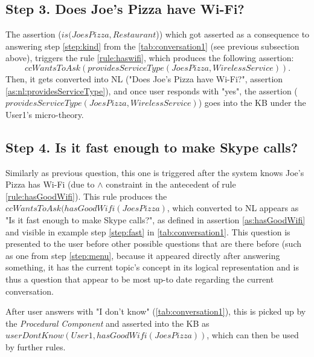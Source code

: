 \subsection{Step 3. Does Joe's Pizza have Wi-Fi?}
\label{section:step3}
The assertion ($is(JoesPizza,Restaurant$)) which got asserted as a consequence
to answering step \ref{step:kind} from the \autoref{tab:conversation1} (see
previous subsection above), triggers the rule \ref{rule:haswifi}, which 
produces the following assertion: 
\begin{equation*}
ccWantsToAsk(providesServiceType(JoesPizza,WirelessService)).
\end{equation*}
Then, it gets converted into NL ("Does Joe's Pizza have Wi-Fi?", 
assertion \ref{as:nl:providesServiceType}), 
and once user responds with "yes", the assertion 
($providesServiceType(JoesPizza,WirelessService)$) goes into the KB under the 
User1's micro-theory.

\subsection{Step 4. Is it fast enough to make Skype calls?}
\label{section:step3}
Similarly as previous question, this one is triggered after the system knows
Joe's Pizza has Wi-Fi (due to $\land $ constraint in the antecedent of rule 
\ref{rule:hasGoodWifi}). This rule produces the 
$ccWantsToAsk(hasGoodWifi(JoesPizza)$, which converted to NL appears as 
"Is it fast enough to make Skype calls?", as defined in assertion 
\ref{as:hasGoodWifi} and visible in example step \ref{step:fast} in 
\autoref{tab:conversation1}. This question is presented to the user before
other possible questions that are there before (such as one from step 
\ref{step:menu}, because it appeared directly after answering something,
it has the current topic's concept in its logical representation and is
thus a question that appear to be most up-to date regarding the current
conversation.

After user answers with "I don't know" (\autoref{tab:conversation1}), this is 
picked up by the \emph{Procedural Component} and asserted into the KB as 
$userDontKnow(User1,hasGoodWifi(JoesPizza))$, which can then be used by further 
rules.

